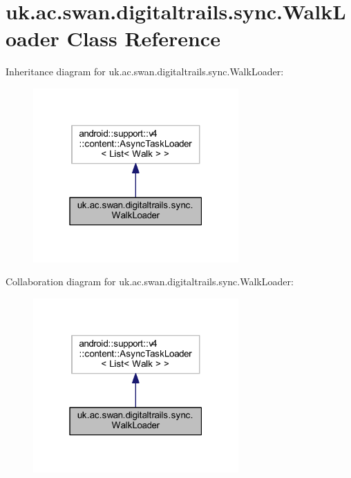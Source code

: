 \hypertarget{classuk_1_1ac_1_1swan_1_1digitaltrails_1_1sync_1_1_walk_loader}{\section{uk.\+ac.\+swan.\+digitaltrails.\+sync.\+Walk\+Loader Class Reference}
\label{classuk_1_1ac_1_1swan_1_1digitaltrails_1_1sync_1_1_walk_loader}
}


Inheritance diagram for uk.\+ac.\+swan.\+digitaltrails.\+sync.\+Walk\+Loader\+:\nopagebreak
\begin{figure}[H]
\begin{center}
\leavevmode
\includegraphics[width=223pt]{classuk_1_1ac_1_1swan_1_1digitaltrails_1_1sync_1_1_walk_loader__inherit__graph}
\end{center}
\end{figure}


Collaboration diagram for uk.\+ac.\+swan.\+digitaltrails.\+sync.\+Walk\+Loader\+:\nopagebreak
\begin{figure}[H]
\begin{center}
\leavevmode
\includegraphics[width=223pt]{classuk_1_1ac_1_1swan_1_1digitaltrails_1_1sync_1_1_walk_loader__coll__graph}
\end{center}
\end{figure}
